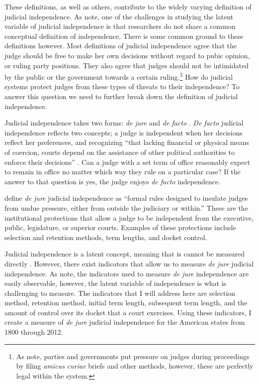 \documentclass[12pt]{article}
\begin{document}
These definitions, as well as others, contribute to the widely varying definition of judicial independence.  As \citet{Linzer2014} note, one of the challenges in studying the latent variable of judicial independence is that researchers do not share a common conceptual definition of independence.  There is some common ground to these definitions however.  Most definitions of judicial independence agree that the judge should be free to make her own decisions without regard to pubic opinion, or ruling party positions.  They also agree that judges should not be intimidated by the public or the government towards a certain ruling.\footnote{As \citet[4]{Rios2014} note, parties and governments put pressure on judges during proceedings by filing \textit{amicus curiae} briefs and other methods, however, these are perfectly legal within the system.}  How do judicial systems protect judges from these types of threats to their independence?  To answer this question we need to further break down the definition of judicial independence. 

Judicial independence takes two forms: \textit{de jure} and \textit{de facto} \citep{Feld2003,Rios2014, Rosenberg1991}.  \textit{De facto} judicial independence reflects two concepts; a judge is independent when her decisions reflect her preferences, and recognizing ``that lacking financial or physical means of coercion, courts depend on the assistance of other political authorities to enforce their decisions'' \citep[4]{Rios2014}. Can a judge with a set term of office reasonably expect to remain in office no matter which way they rule on a particular case? If the answer to that question is yes, the judge enjoys \textit{de facto} independence. 

\citet[3]{Rios2014} define \textit{de jure} judicial independence as ``formal rules designed to insulate judges from undue pressure, either from outside the judiciary or within.''  These are the institutional protections that allow a judge to be independent from the executive, public, legislature, or superior courts.  Examples of these protections include selection and retention methods, term lengths, and docket control.

Judicial independence is a latent concept, meaning that is cannot be measured directly \citep[203]{Treier2008}.  However, there exist indicators that allow us to measure \textit{de jure} judicial independence.  As \citet[5]{Rios2014} note, the indicators used to measure \textit{de jure} independence are easily observable, however, the latent variable of independence is what is challenging to measure.  The indicators that I will address here are selection method, retention method, initial term length, subsequent term length, and the amount of control over its docket that a court exercises.  Using these indicators, I create a measure of \textit{de jure} judicial independence for the American states from 1800 through 2012.
\end{document}
